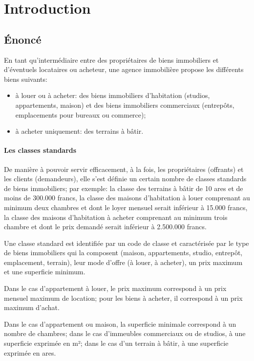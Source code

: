 \chapter{Introduction}

\section{Énoncé}

En tant qu'intermédiaire entre des propriétaires de biens immobiliers et d'éventuels locataires ou acheteur, une agence immobilière propose les différents biens suivants:

\begin{itemize}
  \item à louer ou à acheter: des biens immobiliers d'habitation (studios, appartements, maison) et des biens immobiliers commerciaux (entrepôts, emplacements pour bureaux ou commerce);
  \item à acheter uniquement: des terrains à bâtir.
\end{itemize}

\subsubsection{Les classes standards}

De manière à pouvoir servir efficacement, à la fois, les propriétaires (offrants) et les clients (demandeurs), elle s'est définie un certain nombre de \og{}classes standards\fg{} de biens immobiliers; par exemple: la classe des terrains à bâtir de 10 ares et de moins de 300.000 francs, la classe des maisons d'habitation à louer comprenant au minimum deux chambres et dont le loyer mensuel serait inférieur à 15.000 francs, la classe des maisons d'habitation à acheter comprenant au minimum trois chambre et dont le prix demandé serait inférieur à 2.500.000 francs.

Une classe standard est identifiée par un code de classe et caractérisée par le type de biens immobiliers qui la composent (maison, appartements, studio, entrepôt, emplacement, terrain), leur mode d'offre (à louer, à acheter), un prix maximum et une superficie minimum.

Dans le cas d'appartement à louer, le prix maximum correspond à un prix mensuel maximum de location; pour les biens à acheter, il correspond à un prix maximum d'achat.

Dans le cas d'appartement ou maison, la superficie minimale correspond à un nombre de chambres; dans le cas d'immeubles commerciaux ou de studios, à une superficie exprimée en m²; dans le cas d'un terrain à bâtir, à une superficie exprimée en ares.

